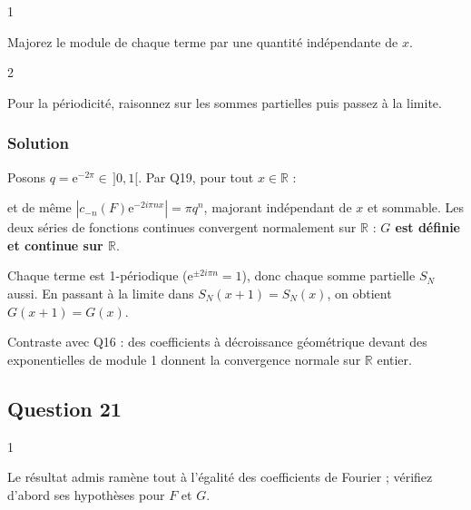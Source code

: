 \documentclass[11pt,a4paper]{article}
\newcommand{\equationajustee}[1]{%
  \sbox{\boiteequation}{$\displaystyle #1$}%
  \ifdim\wd\boiteequation>\linewidth
    \[\resizebox{\linewidth}{!}{\usebox{\boiteequation}}\]%
  \else
    \[#1\]%
  \fi}
\begin{document}
\begin{indication}{1}

Majorez le module de chaque terme par une quantité indépendante de \(x\).

\end{indication}

\begin{indication}{2}

Pour la périodicité, raisonnez sur les sommes partielles puis passez à la limite.

\end{indication}

\hypertarget{solution-19}{%
\subsubsection{Solution}\label{solution-19}}

Posons \(q={\mathrm{e}}^{-2\pi}\in\,]0,1[\). Par Q19, pour tout \(x\in\mathbb{R}\) :

\equationajustee{|c_n(F){\mathrm{e}}^{2i\pi nx}|=\pi q^n,}

et de même \(|c_{-n}(F){\mathrm{e}}^{-2i\pi nx}|=\pi q^n\), majorant indépendant de \(x\) et sommable. Les deux séries de fonctions continues convergent normalement sur \(\mathbb{R}\) : \textbf{\(G\) est définie et continue sur \(\mathbb{R}\)}.

Chaque terme est 1-périodique (\({\mathrm{e}}^{\pm2i\pi n}=1\)), donc chaque somme partielle \(S_N\) aussi. En passant à la limite dans \(S_N(x+1)=S_N(x)\), on obtient \textbf{\(G(x+1)=G(x)\)}.

\begin{methode}

Contraste avec Q16 : des coefficients à décroissance géométrique devant des exponentielles de module 1 donnent la convergence normale sur \(\mathbb{R}\) entier.

\end{methode}

\hypertarget{question-21}{%
\subsection{Question 21}\label{question-21}}

\begin{indication}{1}

Le résultat admis ramène tout à l'égalité des coefficients de Fourier ; vérifiez d'abord ses hypothèses pour \(F\) et \(G\).

\end{indication}
\end{document}
